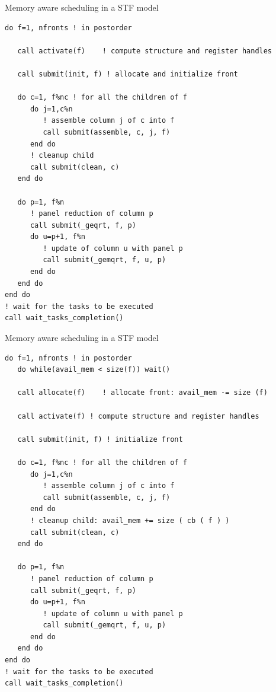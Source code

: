 \begin{frame}{Memory aware scheduling in a STF model}

\begin{lstlisting}[basicstyle=\tt\tiny]
do f=1, nfronts ! in postorder

   call activate(f)    ! compute structure and register handles

   call submit(init, f) ! allocate and initialize front

   do c=1, f%nc ! for all the children of f
      do j=1,c%n
         ! assemble column j of c into f
         call submit(assemble, c, j, f)
      end do
      ! cleanup child
      call submit(clean, c)
   end do

   do p=1, f%n
      ! panel reduction of column p
      call submit(_geqrt, f, p)
      do u=p+1, f%n
         ! update of column u with panel p
         call submit(_gemqrt, f, u, p)
      end do
   end do
end do
! wait for the tasks to be executed
call wait_tasks_completion()
\end{lstlisting}
\end{frame}

\begin{frame}{Memory aware scheduling in a STF model}
\begin{lstlisting}[basicstyle=\tt\tiny]
do f=1, nfronts ! in postorder
   do while(avail_mem < size(f)) wait()
   
   call allocate(f)    ! allocate front: avail_mem -= size (f)

   call activate(f) ! compute structure and register handles
   
   call submit(init, f) ! initialize front

   do c=1, f%nc ! for all the children of f
      do j=1,c%n
         ! assemble column j of c into f
         call submit(assemble, c, j, f)
      end do
      ! cleanup child: avail_mem += size ( cb ( f ) )
      call submit(clean, c)
   end do

   do p=1, f%n
      ! panel reduction of column p
      call submit(_geqrt, f, p)
      do u=p+1, f%n
         ! update of column u with panel p
         call submit(_gemqrt, f, u, p)
      end do
   end do
end do
! wait for the tasks to be executed
call wait_tasks_completion()
\end{lstlisting}

\end{frame}


